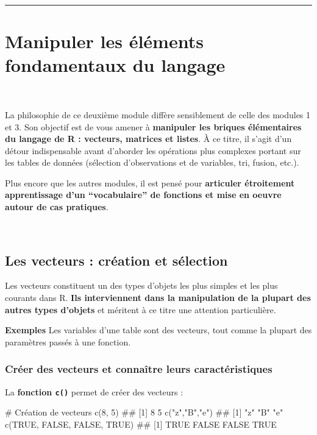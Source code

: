 \documentclass[12pt,twosided, notitlepage]{book}
\newenvironment{Shaded}{}{}
\newcommand{\KeywordTok}[1]{\textcolor[rgb]{0.00,0.00,1.00}{#1}}
\newcommand{\DecValTok}[1]{#1}
\newcommand{\StringTok}[1]{\textcolor[rgb]{0.00,0.50,0.50}{#1}}
\newcommand{\CommentTok}[1]{\textcolor[rgb]{0.00,0.50,0.00}{#1}}
\newcommand{\OtherTok}[1]{\textcolor[rgb]{1.00,0.25,0.00}{#1}}
\newcommand{\NormalTok}[1]{#1}
\renewenvironment{Shaded}{\begin{snugshade}}{\end{snugshade}}
\begin{document}
\begin{center}\rule{0.5\linewidth}{\linethickness}\end{center}


\chapter{Manipuler les éléments fondamentaux du langage}

\minitoc 

~

La philosophie de ce deuxième module diffère sensiblement de celle des
modules 1 et 3. Son objectif est de vous amener à \textbf{manipuler les
briques élémentaires du langage de R : vecteurs, matrices et listes}. À
ce titre, il s'agit d'un détour indispensable avant d'aborder les
opérations plus complexes portant sur les tables de données (sélection
d'observations et de variables, tri, fusion, etc.).

Plus encore que les autres modules, il est pensé pour \textbf{articuler
étroitement apprentissage d'un \enquote{vocabulaire} de fonctions et
mise en oeuvre autour de cas pratiques}.

~

\section{Les vecteurs : création et
sélection}\label{les-vecteurs-creation-et-selection}

Les vecteurs constituent un des types d'objets les plus simples et les
plus courants dans R. \textbf{Ils interviennent dans la manipulation de
la plupart des autres types d'objets} et méritent à ce titre une
attention particulière.

\textbf{Exemples} Les variables d'une table sont des vecteurs, tout
comme la plupart des paramètres passés à une fonction.

\subsection{Créer des vecteurs et connaître leurs
caractéristiques}\label{creer-des-vecteurs-et-connaitre-leurs-caracteristiques}

La \textbf{fonction \texttt{c()}} permet de
créer des vecteurs :

\begin{Shaded}
\begin{Highlighting}[]
\CommentTok{# Création de vecteurs}
\KeywordTok{c}\NormalTok{(}\DecValTok{8}\NormalTok{, }\DecValTok{5}\NormalTok{)}
\NormalTok{  ## [1] 8 5}
\KeywordTok{c}\NormalTok{(}\StringTok{"z"}\NormalTok{,}\StringTok{"B"}\NormalTok{,}\StringTok{"e"}\NormalTok{)}
\NormalTok{  ## [1] "z" "B" "e"}
\KeywordTok{c}\NormalTok{(}\OtherTok{TRUE}\NormalTok{, }\OtherTok{FALSE}\NormalTok{, }\OtherTok{FALSE}\NormalTok{, }\OtherTok{TRUE}\NormalTok{)}
\NormalTok{  ## [1]  TRUE FALSE FALSE  TRUE}
\end{Highlighting}
\end{Shaded}
\end{document}
